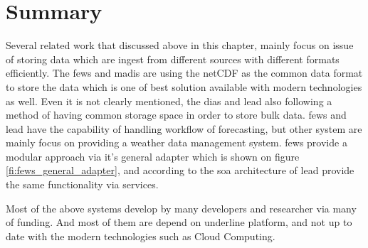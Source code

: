 \section{Summary}
\label{se:lit_summary}
Several related work that discussed above in this chapter, mainly focus on issue of storing data which are ingest from different sources with different formats efficiently. The \acrshort{fews} and \acrshort{madis} are using the \acrshort{netCDF} as the common data format to store the data which is one of best solution available with modern technologies as well. Even it is not clearly mentioned, the \acrshort{dias} and \acrshort{lead} also following a method of having common storage space in order to store bulk data.
\acrshort{fews} and \acrshort{lead} have the capability of handling workflow of forecasting, but other system are mainly focus on providing a weather data management system.
\acrshort{fews} provide a modular approach via it's general adapter which is shown on figure \ref{fi:fews_general_adapter}, and according to the \acrshort{soa} architecture of \acrshort{lead} provide the same functionality via services.

Most of the above systems develop by many developers and researcher via many of funding. And most of them are depend on underline platform, and not up to date with the modern technologies such as Cloud Computing.
